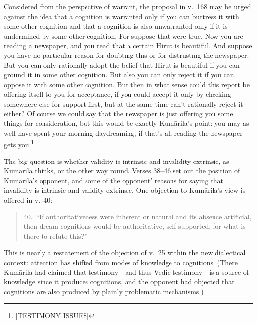 \documentclass[11pt,letterpaper,oneside]{amsart}
\newenvironment{squote}{\begin{quote}\sf\small}{\rm\end{quote}} %
\begin{document}

Considered from the perspective of warrant, the proposal in v.\ 168 may be urged against the idea that a cognition is warranted only if you can buttress it with some other cognition and that a cognition is also unwarranted only if it is undermined by some other cognition. For suppose that were true. Now you are reading a newspaper, and you read that a certain Hirut is beautiful. And suppose you have no particular reason for doubting this or for distrusting the newspaper. But you can only rationally adopt the belief that Hirut is beautiful if you can ground it in some other cognition. But also you can only reject it if you can oppose it with some other cognition. But then in what sense could this report be offering itself to you for acceptance, if you could accept it only by checking somewhere else for support first, but at the same time can't rationally reject it either? Of course we could say that the newspaper is just offering you some things for consideration, but this would be exactly Kum\=arila's point: you may as well have spent your morning daydreaming, if that's all reading the newspaper gets you.\footnote{[TESTIMONY ISSUES]}%

\label{rival} The big question is whether validity is intrinsic and invalidity extrinsic, as Kum\=arila thinks, or the other way round. Verses 38--46 set out the position of Kum\=arila's opponent, and some of the opponent' reasons for saying that invalidity is intrinsic and validity extrinsic. One objection to Kum\=arila's view is offered in v.\ 40:\begin{squote}40.\ ``If authoritativeness were inherent or natural and its absence artificial, then dream-cognitions would be authoritative, self-supported; for what is there to refute this?''\end{squote} This is nearly a restatement of the objection of v.\ 25 within the new dialectical context: attention has shifted from modes of knowledge to cognitions. (There Kum\=arila had claimed that testimony---and thus Vedic testimony---is a source of knowledge since it produces cognitions, and the opponent had objected that cognitions are also produced by plainly problematic mechanisms.)%
\end{document}
